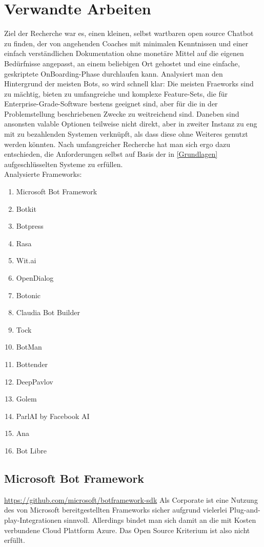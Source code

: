 \chapter{Verwandte Arbeiten}

    Ziel der Recherche war es, einen kleinen, selbst wartbaren open source Chatbot zu finden, der von angehenden Coaches mit minimalen Kenntnissen und einer einfach verständlichen Dokumentation ohne monetäre Mittel auf die eigenen Bedürfnisse angepasst, an einem beliebigen Ort gehostet und eine einfache, geskriptete OnBoarding-Phase durchlaufen kann. Analysiert man den Hintergrund der meisten Bots, so wird schnell klar: Die meisten Fraeworks sind zu mächtig, bieten zu umfangreiche und komplexe Feature-Sets, die für Enterprise-Grade-Software bestens geeignet sind, aber für die in der Problemstellung beschriebenen Zwecke zu weitreichend sind. Daneben sind ansonsten valable Optionen teilweise nicht direkt, aber in zweiter Instanz zu eng mit zu bezahlenden Systemen verknüpft, als dass diese ohne Weiteres genutzt werden könnten. Nach umfangreicher Recherche hat man sich ergo dazu entschieden, die Anforderungen selbst auf Basis der in \ref{Grundlagen} aufgeschlüsselten Systeme zu erfüllen. \\

    Analysierte Frameworks:
    \begin{enumerate}
        \item Microsoft Bot Framework
        \item Botkit
        \item Botpress
        \item Rasa
        \item Wit.ai
        \item OpenDialog
        \item Botonic
        \item Claudia Bot Builder
        \item Tock
        \item BotMan
        \item Bottender
        \item DeepPavlov
        \item Golem
        \item ParlAI by Facebook AI
        \item Ana
        \item Bot Libre
    \end{enumerate}


\section{Microsoft Bot Framework} \url{https://github.com/microsoft/botframework-sdk}
Als Corporate ist eine Nutzung des von Microsoft bereitgestellten Frameworks sicher aufgrund vielerlei Plug-and-play-Integrationen sinnvoll. Allerdings bindet man sich damit an die mit Kosten verbundene Cloud Plattform Azure. Das Open Source Kriterium ist also nicht erfüllt. 


